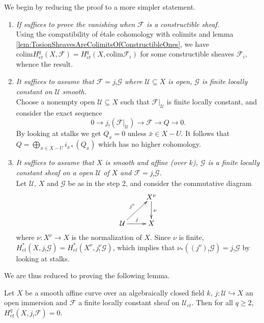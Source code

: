 We begin by reducing the proof to a more simpler statement.
\begin{enumerate}
\item
{\it If suffices to prove the vanishing when $\mathcal{F}$ is a constructible 
sheaf.}
\\
Using the compatibility of \'etale cohomology with colimits and lemma 
\ref{lem:TosionSheavesAreColimitsOfConstructibleOnes}, we have $\text{colim} 
H_{et}^q(X, \mathcal{F}) = H_{et}^q(X, \text{colim} \mathcal{F}_i)$ for some 
constructible sheaves $\mathcal{F}_i$, whence the result.
\item
{\it It suffices to assume that $\mathcal{F} = j_!\mathcal{G}$ where 
$\mathcal{U}\subseteq X$ is open, $\mathcal{G}$ is finite locally constant on 
$\mathcal{U}$ smooth.}
\\
Choose a nonempty open $\mathcal{U}\subseteq X$ such that 
$\mathcal{F}|_\mathcal{U}$ is finite locally constant, and consider the exact 
sequence
$$
0\to j_!(\mathcal{F}|_\mathcal{U})\to \mathcal{F}\to Q\to 0.
$$
By looking at stalks we get $Q_{\bar x}=0$ unless $\bar x\in X-U$. It follows 
that $\displaystyle Q = \bigoplus_{x\in X-U} i_{x*} (Q_x)$
which has no higher cohomology.
\item
{\it It suffices to assume that $X$ is smooth and affine (over $k$), 
$\mathcal{G}$ is a finite locally constant sheaf on a open $\mathcal{U}$ of $X$ 
and $\mathcal{F} = j_!\mathcal{G}$.}
\\
Let $\mathcal{U}$, $X$ and $\mathcal{G}$ be as in the step 2, and consider the 
commutative diagram
$$\xymatrix{
& {X^\nu} \ar^{\nu}[d]\\
{\mathcal{U}} \ar^{j}[r] \ar^{j^\nu}[ur] & {X}
} 
$$
where $\nu: X^\nu \to X$ is the normalization of $X$. Since $\nu$ is finite, 
$H_{et}^*(X, j_!\mathcal{G}) = H_{et}^*(X^\nu, j^\nu_!\mathcal{G})$, which 
implies that $\nu_*((j^\nu)_!\mathcal{G}) = j_!\mathcal{G}$ by looking at 
stalks. 
\end{enumerate}

We are thus reduced to proving the following lemma.

\begin{lemma}
\label{lem:VanishingForSmoothAffineCurvesAndSimpleSheaves}
Let $X$ be a smooth affine curve over an algebraically closed field $k$, $j: 
\mathcal{U} \hookrightarrow X$ an open immersion and $\mathcal{F}$ a finite 
locally constant sheaf on $\mathcal{U}_{et}$. Then for all $q \geq 2$, 
$H_{et}^q(X, j_! \mathcal{F}) = 0$.
\end{lemma}


